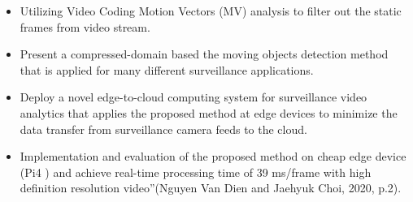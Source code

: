 \begin{itemize}
\item Utilizing Video Coding Motion Vectors (MV) analysis to filter out the static frames from video stream.
\item Present a compressed-domain based the moving objects detection method that is applied for many different surveillance applications.
\item Deploy a novel edge-to-cloud computing system for surveillance video analytics that applies the proposed method at edge devices to minimize the data transfer from surveillance camera feeds to the cloud.
\item Implementation and evaluation of the proposed method on cheap edge device (Pi4 ) and achieve real-time processing time of  39 ms/frame with high definition resolution video”(Nguyen Van Dien and Jaehyuk Choi, 2020, p.2). 
\end{itemize}
%
%
